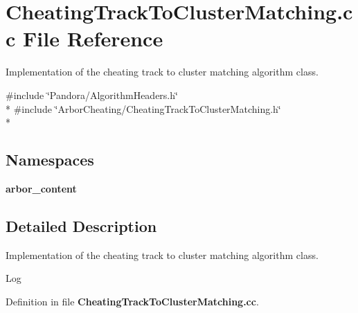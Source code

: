 \section{Cheating\+Track\+To\+Cluster\+Matching.\+cc File Reference}
\label{CheatingTrackToClusterMatching_8cc}


Implementation of the cheating track to cluster matching algorithm class.  


{\ttfamily \#include \char`\"{}Pandora/\+Algorithm\+Headers.\+h\char`\"{}}\\*
{\ttfamily \#include \char`\"{}Arbor\+Cheating/\+Cheating\+Track\+To\+Cluster\+Matching.\+h\char`\"{}}\\*
\subsection*{Namespaces}
\begin{DoxyCompactItemize}
\item 
 {\bf arbor\+\_\+content}
\end{DoxyCompactItemize}


\subsection{Detailed Description}
Implementation of the cheating track to cluster matching algorithm class. 

\begin{DoxyParagraph}{Log}

\end{DoxyParagraph}


Definition in file {\bf Cheating\+Track\+To\+Cluster\+Matching.\+cc}.

